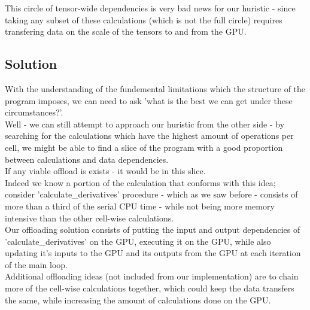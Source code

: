 This circle of tensor-wide dependencies is very bad news for our huristic -
since taking any subset of these calculations (which is not the full circle)
requires transfering data on the scale of the tensors to and from the GPU.\\

\subsection*{Solution}
With the understanding of the fundemental limitations 
which the structure of the program imposes,
we can need to ask 'what is the best we can get under these circumstances?'.\\
Well - we can still attempt to approach our huristic
from the other side - by searching for the calculations 
which have the highest amount of operations per cell,
we might be able to find a slice of the program
with a good proportion between calculations and data dependencies.\\
If any viable offload is exists - it would be in this slice.\\

Indeed we know a portion of the calculation that conforms with this idea;
consider 'calculate\_derivatives' procedure - which as we saw before -
consists of more than a third of the serial CPU time - while not being more memory
intensive than the other cell-wise calculations.\\
Our offloading solution consists of putting the input and
output dependencies of 'calculate\_derivatives' on the GPU,
executing it on the GPU, while also updating it's inputs to the GPU and
its outputs from the GPU at each iteration of the main loop.\\

Additional offloading ideas (not included from our implementation) 
are to chain more of the cell-wise calculations together,
which could keep the data transfers the same, while increasing the
amount of calculations done on the GPU.\\